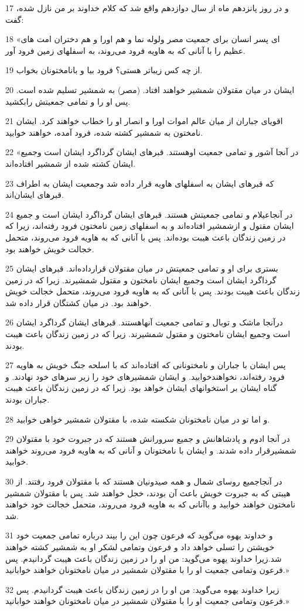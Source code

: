 \par 17 و در روز پانزدهم ماه از سال دوازدهم واقع شد که کلام خداوند بر من نازل شده، گفت:
\par 18 «ای پسر انسان برای جمعیت مصر ولوله نما و هم اورا و هم دختران امت های عظیم را با آنانی که به هاویه فرود می‌روند، به اسفلهای زمین فرود آور.
\par 19 از چه کس زیباتر هستی؟ فرود بیا و بانامختونان بخواب.
\par 20 ایشان در میان مقتولان شمشیر خواهند افتاد. (مصر) به شمشیر تسلیم شده است. پس او را و تمامی جمعیتش رابکشید.
\par 21 اقویای جباران از میان عالم اموات اورا و انصار او را خطاب خواهند کرد. ایشان نامختون به شمشیر کشته شده، فرود آمده، خواهند خوابید.
\par 22 «در آنجا آشور و تمامی جمعیت اوهستند. قبرهای ایشان گرداگرد ایشان است وجمیع ایشان کشته شده از شمشیر افتاده‌اند.
\par 23 که قبرهای ایشان به اسفلهای هاویه قرار داده شد وجمعیت ایشان به اطراف قبرهای ایشان‌اند.
\par 24 در آنجاعیلام و تمامی جمعیتش هستند. قبرهای ایشان گرداگرد ایشان است و جمیع ایشان مقتول و ازشمشیر افتاده‌اند و به اسفلهای زمین نامختون فرود رفته‌اند، زیرا که در زمین زندگان باعث هیبت بوده‌اند. پس با آنانی که به هاویه فرود می‌روند، متحمل خجالت خویش خواهند بود.
\par 25 بستری برای او و تمامی جمعیتش در میان مقتولان قرارداده‌اند. قبرهای ایشان گرداگرد ایشان است وجمیع ایشان نامختون و مقتول شمشیرند. زیرا که در زمین زندگان باعث هیبت بودند. پس با آنانی که به هاویه فرود می‌روند، متحمل خجالت خویش خواهند بود. در میان کشتگان قرار داده شد.
\par 26 درآنجا ماشک و توبال و تمامی جمعیت آنهاهستند. قبرهای ایشان گرداگرد ایشان است وجمیع ایشان نامختون و مقتول شمشیرند. زیرا که در زمین زندگان باعث هیبت بودند.
\par 27 پس ایشان با جباران و نامختونانی که افتاده‌اند که با اسلحه جنگ خویش به هاویه فرود رفته‌اند، نخواهندخوابید. و ایشان شمشیرهای خود را زیر سرهای خود نهادند. و گناه ایشان بر استخوانهای ایشان خواهد بود. زیرا که در زمین زندگان باعث هیبت جباران بودند.
\par 28 و اما تو در میان نامختونان شکسته شده، با مقتولان شمشیر خواهی خوابید.
\par 29 در آنجا ادوم و پادشاهانش و جمیع سرورانش هستند که در جبروت خود با مقتولان شمشیرقرار داده شدند. و ایشان با نامختونان و آنانی که به هاویه فرود می‌روند خواهند خوابید.
\par 30 در آنجاجمیع روسای شمال و همه صیدونیان هستند که با مقتولان فرود رفتند. از هیبتی که به جبروت خویش باعث آن بودند، خجل خواهند شد. پس با مقتولان شمشیر نامختون خواهند خوابید و باآنانی که به هاویه فرود می‌روند، متحمل خجالت خود خواهند شد.
\par 31 و خداوند یهوه می‌گوید که فرعون چون این را بیند درباره تمامی جمعیت خود خویشتن را تسلی خواهد داد و فرعون وتمامی لشکر او به شمشیر کشته خواهند شد.زیرا خداوند یهوه می‌گوید: من او را در زمین زندگان باعث هیبت گردانیدم. پس فرعون وتمامی جمعیت او را با مقتولان شمشیر در میان نامختونان خواهند خوابانید.»
\par 32 زیرا خداوند یهوه می‌گوید: من او را در زمین زندگان باعث هیبت گردانیدم. پس فرعون وتمامی جمعیت او را با مقتولان شمشیر در میان نامختونان خواهند خوابانید.»

